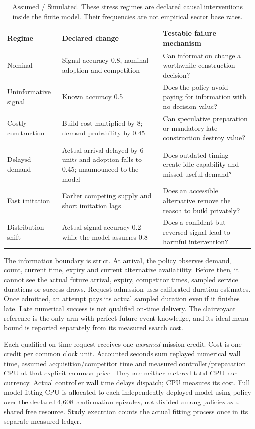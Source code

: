 \documentclass[11pt,a4paper]{article}
\newcommand{\simu}{\textsf{Simulated}}
\newcommand{\assum}{\textsf{Assumed}}
\begin{document}
\begin{table}[ht]\centering\small
\begin{tabularx}{\linewidth}{@{}L{34mm}YY@{}}\toprule
Regime & Declared change & Testable failure mechanism \\\midrule
Nominal & Signal accuracy 0.8, nominal adoption and competition & Can information change a worthwhile construction decision? \\
Uninformative signal & Known accuracy 0.5 & Does the policy avoid paying for information with no decision value? \\
Costly construction & Build cost multiplied by 8; demand probability by 0.45 & Can speculative preparation or mandatory late construction destroy value? \\
Delayed demand & Actual arrival delayed by 6 units and adoption falls to 0.45; unannounced to the model & Does outdated timing create idle capability and missed useful demand? \\
Fast imitation & Earlier competing supply and short imitation lags & Does an accessible alternative remove the reason to build privately? \\
Distribution shift & Actual signal accuracy 0.2 while the model assumes 0.8 & Does a confident but reversed signal lead to harmful intervention? \\\bottomrule
\end{tabularx}
\caption{\assum{} / \simu{}. These stress regimes are declared causal interventions inside the finite model. Their frequencies are not empirical sector base rates.}
\label{tab:regimes}\end{table}

The information boundary is strict. At arrival, the policy observes demand, count, current time, expiry and current alternative availability. Before then, it cannot see the actual future arrival, expiry, competitor times, sampled service durations or success draws. Request admission uses calibrated duration estimates. Once admitted, an attempt pays its actual sampled duration even if it finishes late. Late numerical success is not qualified on-time delivery. The clairvoyant reference is the only arm with perfect future-event knowledge, and its ideal-menu bound is reported separately from its measured search cost.

Each qualified on-time request receives one \emph{assumed} mission credit. Cost is one credit per common clock unit. Accounted seconds sum replayed numerical wall time, assumed acquisition/competitor time and measured controller/preparation CPU at that explicit common price. They are neither metered total CPU nor currency. Actual controller wall time delays dispatch; CPU measures its cost. Full model-fitting CPU is allocated to each independently deployed model-using policy over the declared 4,608 confirmation episodes, not divided among policies as a shared free resource. Study execution counts the actual fitting process once in its separate measured ledger.
\end{document}
